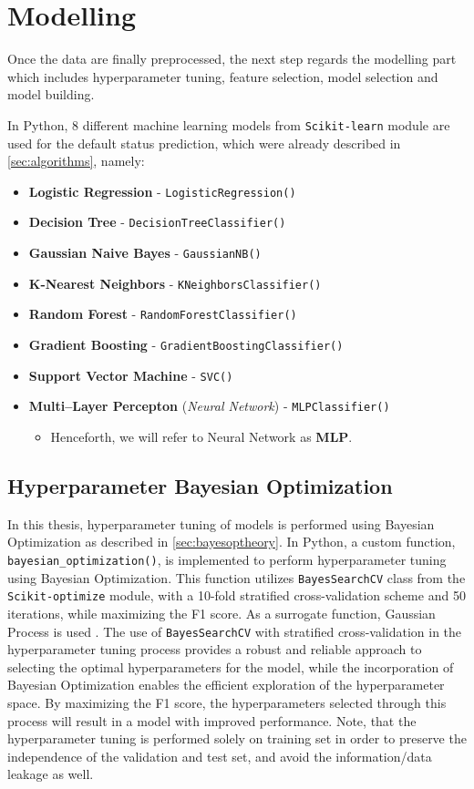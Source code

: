\newpage
\section{Modelling}
\label{sec:modelling}
Once the data are finally preprocessed, the next step regards the modelling part which includes hyperparameter tuning, feature selection, model selection and model building.

In Python, 8 different machine learning models from \lstinline{Scikit-learn} module are used for the default status prediction, which were already described in \autoref{sec:algorithms}, namely:
\begin{itemize}\setlength\itemsep{0em}
\item \textbf{Logistic Regression} - \lstinline{LogisticRegression()}
\item \textbf{Decision Tree} - \lstinline{DecisionTreeClassifier()}
\item \textbf{Gaussian Naive Bayes} - \lstinline{GaussianNB()}
\item \textbf{K-Nearest Neighbors} - \lstinline{KNeighborsClassifier()}
\item \textbf{Random Forest} - \lstinline{RandomForestClassifier()}
\item \textbf{Gradient Boosting} - \lstinline{GradientBoostingClassifier()}
\item \textbf{Support Vector Machine} - \lstinline{SVC()}
\item \textbf{Multi--Layer Percepton} (\textit{Neural Network}) - \lstinline{MLPClassifier()}
\begin{itemize}\setlength\itemsep{0em}
\item Henceforth, we will refer to Neural Network as \textbf{MLP}.
\end{itemize}
\end{itemize}

\subsection{Hyperparameter Bayesian Optimization}
In this thesis, hyperparameter tuning of models is performed using Bayesian Optimization as described in \autoref{sec:bayesoptheory}.
In Python, a custom function, \lstinline{bayesian_optimization()}, is implemented to perform hyperparameter tuning using Bayesian Optimization.
This function utilizes \lstinline{BayesSearchCV} class from the \lstinline{Scikit-optimize} module, with a 10-fold stratified cross-validation scheme and 50 iterations, while maximizing the F1 score. As a surrogate function, Gaussian Process is used \citep{scikit-opt}.
The use of \lstinline{BayesSearchCV} with stratified cross-validation in the hyperparameter tuning process provides a robust and reliable approach to selecting the optimal hyperparameters for the model, while the incorporation of Bayesian Optimization enables the efficient exploration of the hyperparameter space.
By maximizing the F1 score, the hyperparameters selected through this process will result in a model with improved performance. Note, that the hyperparameter tuning is performed solely on training set in order to preserve the independence of the validation and test set, and avoid the information/data leakage as well.

